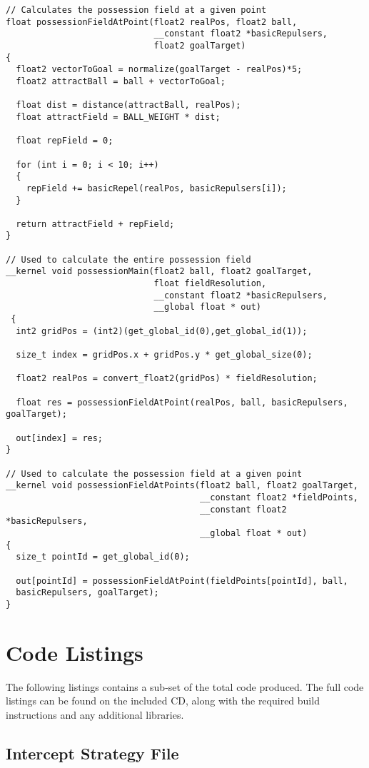 \begin{lstlisting}
// Calculates the possession field at a given point
float possessionFieldAtPoint(float2 realPos, float2 ball, 
                             __constant float2 *basicRepulsers, 
                             float2 goalTarget) 
{
  float2 vectorToGoal = normalize(goalTarget - realPos)*5;
  float2 attractBall = ball + vectorToGoal;

  float dist = distance(attractBall, realPos);
  float attractField = BALL_WEIGHT * dist;

  float repField = 0;

  for (int i = 0; i < 10; i++)
  {
    repField += basicRepel(realPos, basicRepulsers[i]);
  }

  return attractField + repField;
}

// Used to calculate the entire possession field
__kernel void possessionMain(float2 ball, float2 goalTarget, 
                             float fieldResolution, 
                             __constant float2 *basicRepulsers, 
                             __global float * out) 
 { 
  int2 gridPos = (int2)(get_global_id(0),get_global_id(1));

  size_t index = gridPos.x + gridPos.y * get_global_size(0);

  float2 realPos = convert_float2(gridPos) * fieldResolution;

  float res = possessionFieldAtPoint(realPos, ball, basicRepulsers, goalTarget);

  out[index] = res;
}

// Used to calculate the possession field at a given point
__kernel void possessionFieldAtPoints(float2 ball, float2 goalTarget, 
                                      __constant float2 *fieldPoints, 
                                      __constant float2 *basicRepulsers, 
                                      __global float * out) 
{
  size_t pointId = get_global_id(0);

  out[pointId] = possessionFieldAtPoint(fieldPoints[pointId], ball,
  basicRepulsers, goalTarget); 
}
\end{lstlisting}

\section{Code Listings \label{sec:Code-Listings}}

The following listings contains a sub-set of the total code produced.  The full
code listings can be found on the included CD, along with the required build
instructions and any additional libraries.

\subsection{Intercept Strategy File}



\cleardoublepage{}


